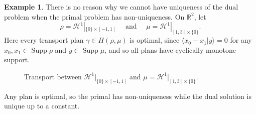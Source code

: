 \documentclass[11pt, oneside, titlepage]{book}
\theoremstyle{plain}
\theoremstyle{definition}
\newtheorem{example}[theorem]{Example}
\newcommand{\R}{\mathbb{R}}
\DeclareMathOperator{\supp}{Supp}
\begin{document}
\begin{example}
    There is no reason why we cannot have uniqueness of the dual problem when the primal problem has non-uniqueness. On $\R^2$, let
    \begin{equation*}
        \rho = \mathcal{H}^1|_{\{0\} \times [-1, 1]} \quad \text{ and } \quad \mu = \mathcal{H}^1|_{[1, 3] \times \{0\}}.
    \end{equation*}
    Here every transport plan $\gamma \in \Pi(\rho, \mu)$ is optimal, since $\langle x_0 - x_1 | y \rangle = 0$ for any $x_0, x_1 \in \supp \rho$ and $y \in \supp \mu$, and so all plans have cyclically monotone support.

\begin{figure}[ht]
\centering
{}

\caption{Transport between $\mathcal{H}^1|_{\{0\} \times [-1, 1]}$ and $\mu = \mathcal{H}^1|_{[1, 3] \times \{0\}}$.}
\label{fig:primal-nonunique-dual-unique}
\end{figure}
Any plan is optimal, so the primal has non-uniqueness while the dual solution is unique up to a constant.

\end{example}
\end{document}
